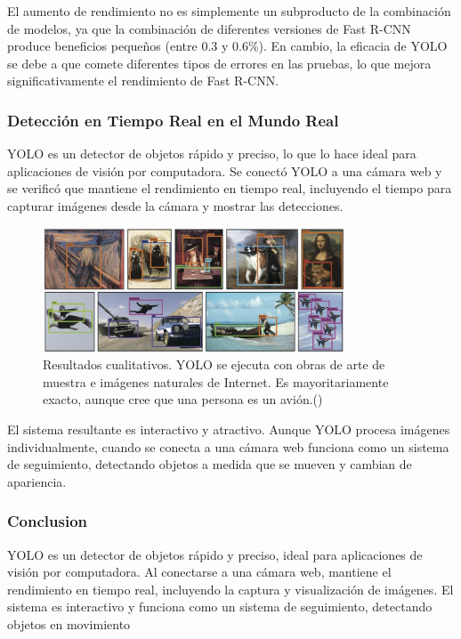 El aumento de rendimiento no es simplemente un subproducto de la combinación de modelos, ya que la combinación de diferentes versiones de Fast R-CNN produce beneficios pequeños (entre 0.3 y 0.6\%). En cambio, la eficacia de YOLO se debe a que comete diferentes tipos de errores en las pruebas, lo que mejora significativamente el rendimiento de Fast R-CNN.


\subsubsection{Detección en Tiempo Real en el Mundo Real}

YOLO es un detector de objetos rápido y preciso, lo que lo hace ideal para aplicaciones de visión por computadora. Se conectó YOLO a una cámara web y se verificó que mantiene el rendimiento en tiempo real, incluyendo el tiempo para capturar imágenes desde la cámara y mostrar las detecciones.

\begin{figure}[h]
	\centering
	\includegraphics[width=0.8\textwidth]{2/figures/yolo5.jpeg}
	\caption{Resultados cualitativos. YOLO se ejecuta con obras de arte de muestra e imágenes naturales de Internet. Es mayoritariamente exacto, aunque cree que una persona es un avión.(\cite{tecnica4})}
	
\end{figure}

El sistema resultante es interactivo y atractivo. Aunque YOLO procesa imágenes individualmente, cuando se conecta a una cámara web funciona como un sistema de seguimiento, detectando objetos a medida que se mueven y cambian de apariencia.

\subsubsection{Conclusion}
YOLO es un detector de objetos rápido y preciso, ideal para aplicaciones de visión por computadora. Al conectarse a una cámara web, mantiene el rendimiento en tiempo real, incluyendo la captura y visualización de imágenes. El sistema es interactivo y funciona como un sistema de seguimiento, detectando objetos en movimiento


